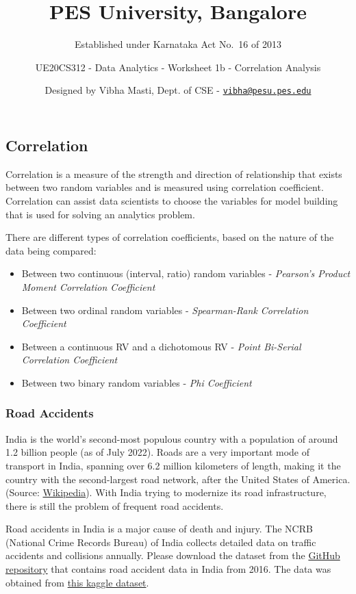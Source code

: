 \documentclass[
]{article}
\title{PES University, Bangalore}
\subtitle{Established under Karnataka Act No.~16 of 2013}
\author{UE20CS312 - Data Analytics - Worksheet 1b - Correlation
Analysis \and Designed by Vibha Masti, Dept. of CSE -
\href{mailto:vibha@pesu.pes.edu}{\nolinkurl{vibha@pesu.pes.edu}}}
\date{}
\providecommand{\tightlist}{%
  \setlength{\itemsep}{0pt}\setlength{\parskip}{0pt}}
\begin{document}
\maketitle

\hypertarget{correlation}{%
\subsection{Correlation}\label{correlation}}

Correlation is a measure of the strength and direction of relationship
that exists between two random variables and is measured using
correlation coefficient. Correlation can assist data scientists to
choose the variables for model building that is used for solving an
analytics problem.

There are different types of correlation coefficients, based on the
nature of the data being compared:

\begin{itemize}
\tightlist
\item
  Between two continuous (interval, ratio) random variables -
  \emph{Pearson's Product Moment Correlation Coefficient}
\item
  Between two ordinal random variables - \emph{Spearman-Rank Correlation
  Coefficient}
\item
  Between a continuous RV and a dichotomous RV - \emph{Point Bi-Serial
  Correlation Coefficient}
\item
  Between two binary random variables - \emph{Phi Coefficient}
\end{itemize}

\hypertarget{road-accidents}{%
\subsubsection{Road Accidents}\label{road-accidents}}

India is the world's second-most populous country with a population of
around 1.2 billion people (as of July 2022). Roads are a very important
mode of transport in India, spanning over 6.2 million kilometers of
length, making it the country with the second-largest road network,
after the United States of America. (Source:
\href{https://en.wikipedia.org/wiki/Roads_in_India}{Wikipedia}). With
India trying to modernize its road infrastructure, there is still the
problem of frequent road accidents.

Road accidents in India is a major cause of death and injury. The NCRB
(National Crime Records Bureau) of India collects detailed data on
traffic accidents and collisions annually. Please download the dataset
from the
\href{https://github.com/Data-Analytics-UE20CS312/Unit-1-Worksheets/blob/main/1b\%20-\%20Correlation\%20Analysis/road_accidents_india_2016.csv}{GitHub
repository} that contains road accident data in India from 2016. The
data was obtained from
\href{https://www.kaggle.com/datasets/greeshmagirish/road-accidents-in-india-20142017}{this
kaggle dataset}.
\end{document}
